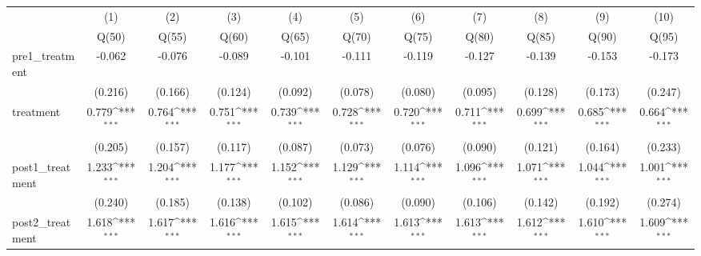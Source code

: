 {
\def\sym#1{\ifmmode^{#1}\else\(^{#1}\)\fi}
\begin{tabular}{l*{10}{c}}
\toprule
            &\multicolumn{1}{c}{(1)}&\multicolumn{1}{c}{(2)}&\multicolumn{1}{c}{(3)}&\multicolumn{1}{c}{(4)}&\multicolumn{1}{c}{(5)}&\multicolumn{1}{c}{(6)}&\multicolumn{1}{c}{(7)}&\multicolumn{1}{c}{(8)}&\multicolumn{1}{c}{(9)}&\multicolumn{1}{c}{(10)}\\
            &\multicolumn{1}{c}{Q(50)}&\multicolumn{1}{c}{Q(55)}&\multicolumn{1}{c}{Q(60)}&\multicolumn{1}{c}{Q(65)}&\multicolumn{1}{c}{Q(70)}&\multicolumn{1}{c}{Q(75)}&\multicolumn{1}{c}{Q(80)}&\multicolumn{1}{c}{Q(85)}&\multicolumn{1}{c}{Q(90)}&\multicolumn{1}{c}{Q(95)}\\
\midrule
pre1\_treatment&      -0.062         &      -0.076         &      -0.089         &      -0.101         &      -0.111         &      -0.119         &      -0.127         &      -0.139         &      -0.153         &      -0.173         \\
            &     (0.216)         &     (0.166)         &     (0.124)         &     (0.092)         &     (0.078)         &     (0.080)         &     (0.095)         &     (0.128)         &     (0.173)         &     (0.247)         \\
\addlinespace
treatment   &       0.779\sym{***}&       0.764\sym{***}&       0.751\sym{***}&       0.739\sym{***}&       0.728\sym{***}&       0.720\sym{***}&       0.711\sym{***}&       0.699\sym{***}&       0.685\sym{***}&       0.664\sym{***}\\
            &     (0.205)         &     (0.157)         &     (0.117)         &     (0.087)         &     (0.073)         &     (0.076)         &     (0.090)         &     (0.121)         &     (0.164)         &     (0.233)         \\
\addlinespace
post1\_treatment&       1.233\sym{***}&       1.204\sym{***}&       1.177\sym{***}&       1.152\sym{***}&       1.129\sym{***}&       1.114\sym{***}&       1.096\sym{***}&       1.071\sym{***}&       1.044\sym{***}&       1.001\sym{***}\\
            &     (0.240)         &     (0.185)         &     (0.138)         &     (0.102)         &     (0.086)         &     (0.090)         &     (0.106)         &     (0.142)         &     (0.192)         &     (0.274)         \\
\addlinespace
post2\_treatment&       1.618\sym{***}&       1.617\sym{***}&       1.616\sym{***}&       1.615\sym{***}&       1.614\sym{***}&       1.613\sym{***}&       1.613\sym{***}&       1.612\sym{***}&       1.610\sym{***}&       1.609\sym{***}\\

\end{tabular}}
